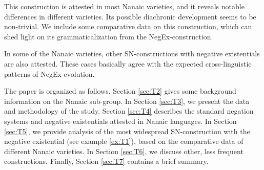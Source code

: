 \documentclass[output=paper]{langscibook}
\begin{document}

This construction is attested in most Nanaic varieties, and it reveals notable differences in different varieties. Its possible diachronic development seems to be non-trivial. We include some comparative data on this construction, which can shed light on its grammaticalization from the NegEx-construction.

In some of the Nanaic varieties, other SN-constructions with negative existentials are also attested. These cases basically agree with the expected cross-linguistic patterns of NegEx-evolution.

The paper is organized as follows. Section \ref{sec:T2} gives some background information on the Nanaic sub-group. In Section \ref{sec:T3}, we present the data and methodology of the study. Section \ref{sec:T4} describes the standard negation systems and negative existentials attested in Nanaic languages. In Section \ref{sec:T5}, we provide analysis of the most widespread SN-construction with the negative existential (see example \ref{ex:T1}), based on the comparative data of different Nanaic varieties. In Section \ref{sec:T6}, we discuss other, less frequent constructions. Finally, Section \ref{sec:T7} contains a brief summary.
\end{document}
